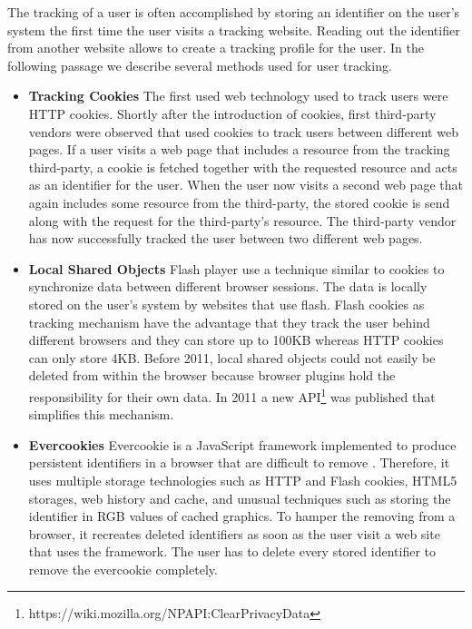 	The tracking of a user is often accomplished by storing an identifier on the user's system the first time the user visits a tracking website. Reading out the identifier from another website allows to create a tracking profile for the user. In the following passage we describe several methods used for user tracking. \\
	
	\begin{itemize}
		\item \textbf{Tracking Cookies} The first used web technology used to track users were HTTP cookies. Shortly after the introduction of cookies, first third-party vendors were observed that used cookies to track users between different web pages. If a user visits a web page that includes a resource from the tracking third-party, a cookie is fetched together with the requested resource and acts as an identifier for the user. When the user now visits a second web page that again includes some resource from the third-party, the stored cookie is send along with the request for the third-party's resource. The third-party vendor has now successfully tracked the user between two different web pages.  
		
		\item \textbf{Local Shared Objects} Flash player use a technique similar to cookies to synchronize data between different browser sessions. The data is locally stored on the user's system by websites that use flash. Flash cookies as tracking mechanism have the advantage that they track the user behind different browsers and they can store up to 100KB whereas HTTP cookies can only store 4KB. Before 2011, local shared objects could not easily be deleted from within the browser because browser plugins hold the responsibility for their own data. In 2011 a new API\footnote{https://wiki.mozilla.org/NPAPI:ClearPrivacyData} was published that simplifies this mechanism. 
		
		\item \textbf{Evercookies} Evercookie is a JavaScript framework implemented to produce persistent identifiers in a browser that are difficult to remove \cite{evercookie}. Therefore, it uses multiple storage technologies such as HTTP and Flash cookies, HTML5 storages, web history and cache, and unusual techniques such as storing the identifier in RGB values of cached graphics. To hamper the removing from a browser, it recreates deleted identifiers as soon as the user visit a web site that uses the framework. The user has to delete every stored identifier to remove the evercookie completely. 
		

\end{itemize}
